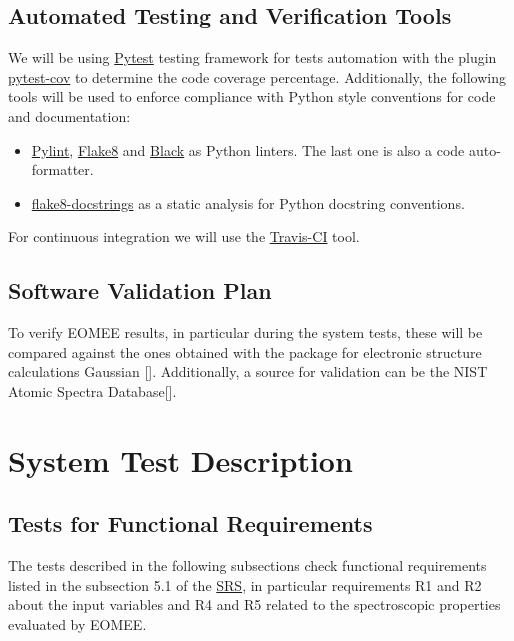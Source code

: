 \documentclass[12pt, titlepage]{article}
\begin{document}
\subsection{Automated Testing and Verification Tools}
 
We will be using \href{https://docs.pytest.org/en/stable/} 
{Pytest} testing framework for tests automation  with the plugin 
\href{https://pytest-cov.readthedocs.io/en/latest/} {pytest-cov} to 
determine the code coverage percentage. Additionally, the following tools 
will be 
used to enforce compliance with Python style 
conventions for code and documentation:
\begin{itemize}
\item \href{https://www.pylint.org/} {Pylint}, 
\href{https://flake8.pycqa.org/en/latest/} {Flake8} and 
\href{https://black.readthedocs.io/en/stable/#} {Black} as Python linters. The 
last one is also a code auto-formatter. 
\item \href{https://pypi.org/project/flake8-docstrings/} {flake8-docstrings} as 
a static analysis for Python docstring conventions.
\end{itemize}
For continuous integration we will use the \href{https://travis-ci.org/} 
{Travis-CI} tool.

\subsection{Software Validation Plan}

To verify EOMEE results, in particular during the system tests, 
these will be compared against the ones obtained with the package for 
electronic structure calculations Gaussian [\cite{g16}]. Additionally, a source 
for validation can be the NIST Atomic Spectra Database[\cite{NIST_ASD}].

\section{System Test Description}
\label{section:systemtests}
	
\subsection{Tests for Functional Requirements}

%
The tests described in the following subsections check functional requirements 
listed in the subsection 5.1 of the 
\href{https://github.com/gabrielasd/eomee/tree/cas741/docs/SRS} {SRS}, in 
particular requirements R1 and R2 about the input variables and R4 and R5 
related to the spectroscopic properties evaluated by EOMEE.
\end{document}
